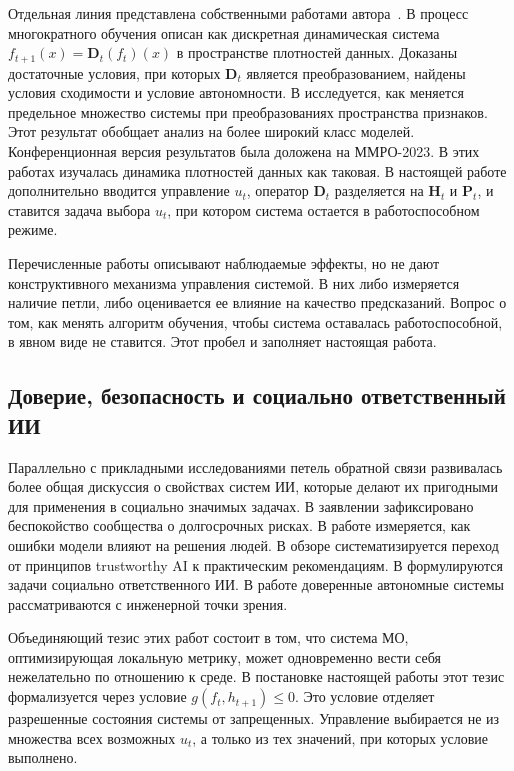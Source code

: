 \documentclass[a4paper,14pt,oneside,openany]{extarticle}
\newcommand{\bD}{\mathbf{D}}
\newcommand{\bH}{\mathbf{H}}
\newcommand{\bP}{\mathbf{P}}
\begin{document}
Отдельная линия представлена собственными работами автора~\cite{veprikov2025mathematical, veprikov2025properties, veprikov2023matematicheskaya}. В \cite{veprikov2025mathematical} процесс многократного обучения описан как дискретная динамическая система $f_{t+1}(x) = \bD_t(f_t)(x)$ в пространстве плотностей данных. Доказаны достаточные условия, при которых $\bD_t$ является преобразованием, найдены условия сходимости и условие автономности. В \cite{veprikov2025properties} исследуется, как меняется предельное множество системы при преобразованиях пространства признаков. Этот результат обобщает анализ \cite{khritankov2021hidden, khritankov2023positive} на более широкий класс моделей. Конференционная версия результатов \cite{veprikov2023matematicheskaya} была доложена на ММРО-2023. В этих работах изучалась динамика плотностей данных как таковая. В настоящей работе дополнительно вводится управление $u_t$, оператор $\bD_t$ разделяется на $\bH_t$ и $\bP_t$, и ставится задача выбора $u_t$, при котором система остается в работоспособном режиме.

Перечисленные работы описывают наблюдаемые эффекты, но не дают конструктивного механизма управления системой. В них либо измеряется наличие петли, либо оценивается ее влияние на качество предсказаний. Вопрос о том, как менять алгоритм обучения, чтобы система оставалась работоспособной, в явном виде не ставится. Этот пробел и заполняет настоящая работа.

\subsection{Доверие, безопасность и социально ответственный ИИ}

Параллельно с прикладными исследованиями петель обратной связи развивалась более общая дискуссия о свойствах систем ИИ, которые делают их пригодными для применения в социально значимых задачах. В заявлении \cite{cais2023statementairisk} зафиксировано беспокойство сообщества о долгосрочных рисках. В работе \cite{suresh2020misplaced} измеряется, как ошибки модели влияют на решения людей. В обзоре \cite{li2023trustworthy} систематизируется переход от принципов trustworthy AI к практическим рекомендациям. В \cite{cheng2021socially} формулируются задачи социально ответственного ИИ. В работе \cite{sifakis2023trustworthy} доверенные автономные системы рассматриваются с инженерной точки зрения.

Объединяющий тезис этих работ состоит в том, что система МО, оптимизирующая локальную метрику, может одновременно вести себя нежелательно по отношению к среде. В постановке настоящей работы этот тезис формализуется через условие $g(f_t, h_{t+1}) \leq 0$. Это условие отделяет разрешенные состояния системы от запрещенных. Управление выбирается не из множества всех возможных $u_t$, а только из тех значений, при которых условие выполнено.
\end{document}
